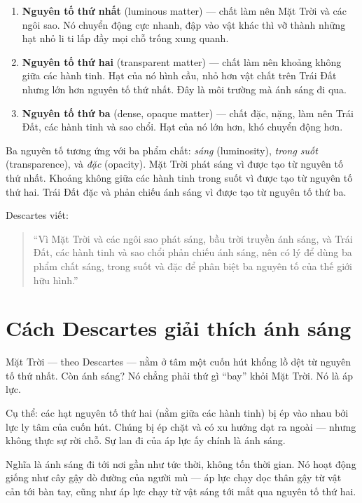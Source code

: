 \begin{enumerate}
  \item \textbf{Nguyên tố thứ nhất} (luminous matter) — chất làm nên Mặt Trời và các ngôi sao. Nó chuyển động cực nhanh, đập vào vật khác thì vỡ thành những hạt nhỏ li ti lấp đầy mọi chỗ trống xung quanh.
  \item \textbf{Nguyên tố thứ hai} (transparent matter) — chất làm nên khoảng không giữa các hành tinh. Hạt của nó hình cầu, nhỏ hơn vật chất trên Trái Đất nhưng lớn hơn nguyên tố thứ nhất. Đây là môi trường mà ánh sáng đi qua.
  \item \textbf{Nguyên tố thứ ba} (dense, opaque matter) — chất đặc, nặng, làm nên Trái Đất, các hành tinh và sao chổi. Hạt của nó lớn hơn, khó chuyển động hơn.
\end{enumerate}

Ba nguyên tố tương ứng với ba phẩm chất: \emph{sáng} (luminosity), \emph{trong suốt} (transparence), và \emph{đặc} (opacity). Mặt Trời phát sáng vì được tạo từ nguyên tố thứ nhất. Khoảng không giữa các hành tinh trong suốt vì được tạo từ nguyên tố thứ hai. Trái Đất đặc và phản chiếu ánh sáng vì được tạo từ nguyên tố thứ ba.

Descartes viết:
\begin{quote}
“Vì Mặt Trời và các ngôi sao phát sáng, bầu trời truyền ánh sáng, và Trái Đất, các hành tinh và sao chổi phản chiếu ánh sáng, nên có lý để dùng ba phẩm chất sáng, trong suốt và đặc để phân biệt ba nguyên tố của thế giới hữu hình.”
\end{quote}


\section{Cách Descartes giải thích ánh sáng}

Mặt Trời — theo Descartes — nằm ở tâm một cuốn hút khổng lồ dệt từ nguyên tố thứ nhất. Còn ánh sáng? Nó chẳng phải thứ gì “bay” khỏi Mặt Trời. Nó là áp lực.

Cụ thể: các hạt nguyên tố thứ hai (nằm giữa các hành tinh) bị ép vào nhau bởi lực ly tâm của cuốn hút. Chúng bị ép chặt và có xu hướng dạt ra ngoài — nhưng không thực sự rời chỗ. Sự lan đi của áp lực ấy chính là ánh sáng.

Nghĩa là ánh sáng đi tới nơi gần như tức thời, không tốn thời gian. Nó hoạt động giống như cây gậy dò đường của người mù — áp lực chạy dọc thân gậy từ vật cản tới bàn tay, cũng như áp lực chạy từ vật sáng tới mắt qua nguyên tố thứ hai.


